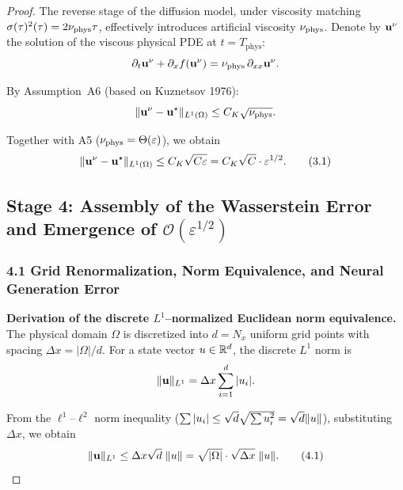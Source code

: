 \begin{proof}
The reverse stage of the diffusion model, under viscosity matching $\sigma(\tau)^2(\tau) = 2\nu_{\mathrm{phys}} \tau$, effectively introduces artificial viscosity $\nu_{\mathrm{phys}}$. Denote by $\mathbf{u}^{\nu}$ the solution of the viscous physical PDE at $t = T_{\mathrm{phys}}$:
\begin{equation}
  \partial_t \mathbf{u}^{\nu} + \partial_x f(\mathbf{u}^{\nu}) = \nu_{\mathrm{phys}} \, \partial_{xx} \mathbf{u}^{\nu}.
\end{equation}

By Assumption~A6 (based on Kuznetsov 1976):
\begin{equation}
  \lVert \mathbf{u}^{\nu} - \mathbf{u}^{\star} \rVert_{L^1(\Omega)} \leq C_K \sqrt{\nu_{\mathrm{phys}}}.
\end{equation}

Together with A5 ($\nu_{\mathrm{phys}} = \Theta(\varepsilon)$), we obtain
\begin{equation}\label{eq:3.1}
  \lVert \mathbf{u}^{\nu} - \mathbf{u}^{\star} \rVert_{L^1(\Omega)} \leq C_K \sqrt{C\varepsilon} = C_K \sqrt{C} \cdot \varepsilon^{1/2}. \tag{3.1}
\end{equation}

\subsection{Stage 4: Assembly of the Wasserstein Error and Emergence of \texorpdfstring{$\mathcal{O}(\varepsilon^{1/2})$}{O(epsilon\^{}1/2)}}\label{sec:stage4}

\subsubsection{4.1 Grid Renormalization, Norm Equivalence, and Neural Generation Error}

\textbf{Derivation of the discrete $L^1$--normalized Euclidean norm equivalence.}
The physical domain $\Omega$ is discretized into $d = N_x$ uniform grid points with spacing $\Delta x = |\Omega|/d$.
For a state vector $u \in \mathbb{R}^d$, the discrete $L^1$ norm is
\begin{equation}
  \lVert \mathbf{u} \rVert_{L^1} = \Delta x \sum_{i=1}^d |u_i|.
\end{equation}

From the $\ell^1$--$\ell^2$ norm inequality ($\sum |u_i| \leq \sqrt{d} \sqrt{\sum u_i^2} = \sqrt{d}\lVert u \rVert$), substituting $\Delta x$, we obtain
\begin{equation}\label{eq:4.1}
  \lVert \mathbf{u} \rVert_{L^1} \leq \Delta x \sqrt{d} \; \lVert u \rVert = \sqrt{|\Omega|} \cdot \sqrt{\Delta x} \; \lVert u \rVert. \tag{4.1}
\end{equation}


\end{proof}

